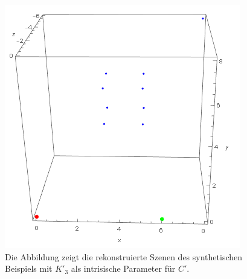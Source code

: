 \begin{figure}[!htb]
	\centering
	\includegraphics[width=0.5\linewidth]{images/DifferentAufloesungRekonstructedScene.png}
	\caption[Rekonstruierte Szene bei unterschiedlichen Kameraauflösungen]{Die Abbildung zeigt die rekonstruierte Szenen des synthetischen Beispiels mit $K'_3$ als intrisische Parameter für $C'$.} 
	\label{fig:reconstructedDifferentResolutions}
\end{figure}



